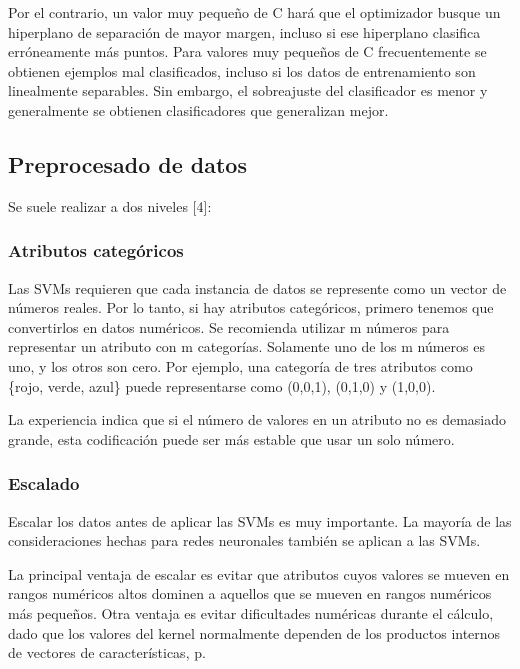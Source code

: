 \documentclass[11pt]{article}
\begin{document}
Por el contrario, un valor muy pequeño de C hará que el optimizador
busque un hiperplano de separación de mayor margen, incluso si ese
hiperplano clasifica erróneamente más puntos. Para valores muy pequeños
de C frecuentemente se obtienen ejemplos mal clasificados, incluso si
los datos de entrenamiento son linealmente separables. Sin embargo, el
sobreajuste del clasificador es menor y generalmente se obtienen
clasificadores que generalizan mejor.

\subsection{Preprocesado de datos}\label{preprocesado-de-datos}

Se suele realizar a dos niveles {[}4{]}:

\subsubsection{Atributos categóricos}\label{atributos-categuxf3ricos}

Las SVMs requieren que cada instancia de datos se represente como un
vector de números reales. Por lo tanto, si hay atributos categóricos,
primero tenemos que convertirlos en datos numéricos. Se recomienda
utilizar m números para representar un atributo con m categorías.
Solamente uno de los m números es uno, y los otros son cero. Por
ejemplo, una categoría de tres atributos como \{rojo, verde, azul\}
puede representarse como (0,0,1), (0,1,0) y (1,0,0).

La experiencia indica que si el número de valores en un atributo no es
demasiado grande, esta codificación puede ser más estable que usar un
solo número.

\subsubsection{Escalado}\label{escalado}

Escalar los datos antes de aplicar las SVMs es muy importante. La
mayoría de las consideraciones hechas para redes neuronales también se
aplican a las SVMs.

La principal ventaja de escalar es evitar que atributos cuyos valores se
mueven en rangos numéricos altos dominen a aquellos que se mueven en
rangos numéricos más pequeños. Otra ventaja es evitar dificultades
numéricas durante el cálculo, dado que los valores del kernel
normalmente dependen de los productos internos de vectores de
características, p.
\end{document}

